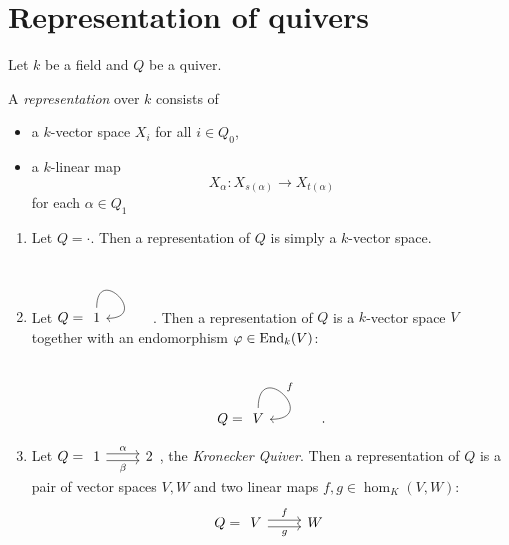 \section{Representation of quivers}
Let $k$ be a field and $Q$ be a quiver.
\begin{defn}
  A \emph{representation}   over $k$ consists of
  \begin{itemize}
    \item a $k$-vector space $X_i$ for all $i\in Q_0$,
    \item a $k$-linear map
    \[
    X_{\alpha}:X_{s(\alpha)}\to X_{t(\alpha)}
    \]
    for each $\alpha\in Q_1$
  \end{itemize}
\end{defn}
\begin{bsp}\label{2:quivref}
  \begin{enumerate}
    \item Let $Q=\cdot$. Then a representation of $Q$ is simply a $k$-vector space.
    \item Let $Q=\begin{tikzcd}1\arrow[out=90,in=0,loop]\end{tikzcd}$. Then a representation of $Q$ is a $k$-vector space $V$ together with an endomorphism $\varphi \in \operatorname{End}_k(V)$:
    \[
    Q=\begin{tikzcd}V\arrow[out=90,in=0,loop,"f"]\end{tikzcd}.
    \]
    \item Let $Q =\begin{tikzcd}1\ar[shift left]{r}{\alpha}\ar[shift right,swap]{r}{\beta}&2\end{tikzcd}$, the \emph{Kronecker Quiver}. Then a representation of $Q$ is a pair of vector spaces $V,W$ and two linear maps $f,g \in \hom_K(V,W)$:
    \[
    Q =\begin{tikzcd}V\ar[shift left]{r}{f}\ar[shift right,swap]{r}{g}&W\end{tikzcd}
    \]
  \end{enumerate}
\end{bsp}

